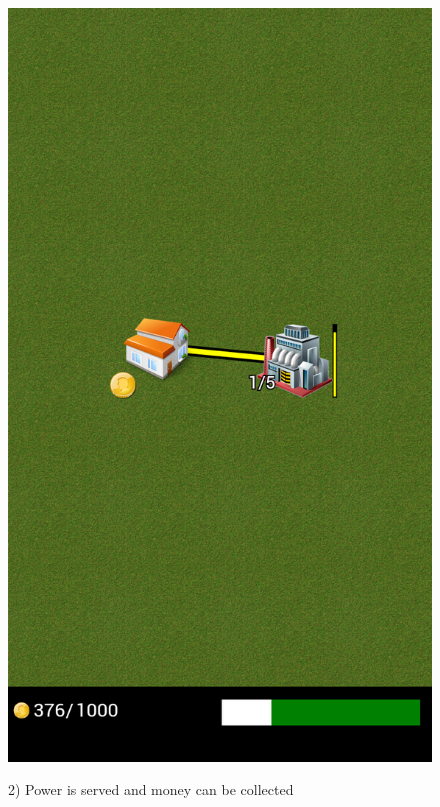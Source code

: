 \begin{figure}[H]
{			\includegraphics[scale=0.18]{pictures/sprint3-screen/buildPowerline_5.png}
		}
		\caption{2) Power is served and money can be collected}
	\end{figure}

